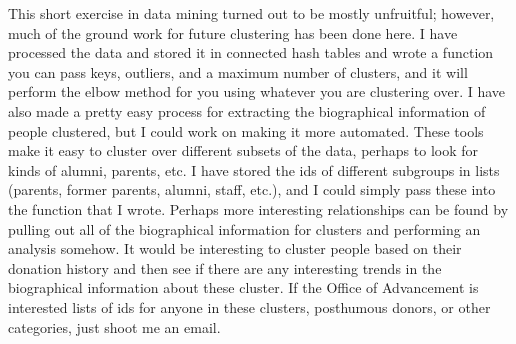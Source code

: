 \documentclass[../main.txt]{subfiles}
\begin{document}
This short exercise in data mining turned out to be mostly unfruitful;
however, much of the ground work for future clustering has been done here.
I have processed the data and stored it in connected hash tables and wrote a function you can
pass keys, outliers, and a maximum number of clusters, and it will perform
the elbow method for you using whatever you are clustering over. I have also
made a pretty easy process for extracting the biographical information of
people clustered, but I could work on making it more automated. These tools
make it easy to cluster over different subsets of the data, perhaps to look
for kinds of alumni, parents, etc. I have stored the ids of different
subgroups in lists (parents, former parents, alumni, staff, etc.), and I
could simply pass these into the function that I wrote. Perhaps more
interesting relationships can be found by pulling out all of the
biographical information for clusters and performing an analysis somehow. It
would be interesting to cluster people based on their donation history and
then see if there are any interesting trends in the biographical information
about these cluster. If
the Office of Advancement is interested lists of ids for anyone in these
clusters, posthumous donors, or other categories, just shoot me an email.
\end{document}
